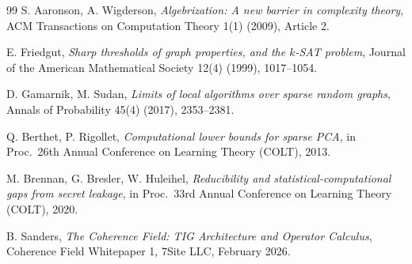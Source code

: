 \documentclass[11pt]{article}
\theoremstyle{definition}
\theoremstyle{remark}
\begin{document}
\begin{thebibliography}{99}
  S. Aaronson, A. Wigderson,
  \textit{Algebrization: A new barrier in complexity theory},
  ACM Transactions on Computation Theory 1(1) (2009), Article 2.

  E. Friedgut,
  \textit{Sharp thresholds of graph properties, and the $k$-SAT problem},
  Journal of the American Mathematical Society 12(4) (1999), 1017--1054.

  D. Gamarnik, M. Sudan,
  \textit{Limits of local algorithms over sparse random graphs},
  Annals of Probability 45(4) (2017), 2353--2381.

  Q. Berthet, P. Rigollet,
  \textit{Computational lower bounds for sparse PCA},
  in Proc.\ 26th Annual Conference on Learning Theory (COLT), 2013.

  M. Brennan, G. Bresler, W. Huleihel,
  \textit{Reducibility and statistical-computational gaps from secret leakage},
  in Proc.\ 33rd Annual Conference on Learning Theory (COLT), 2020.

  B. Sanders,
  \textit{The Coherence Field: TIG Architecture and Operator Calculus},
  Coherence Field Whitepaper 1, 7Site LLC, February 2026.

\end{thebibliography}
\end{document}
